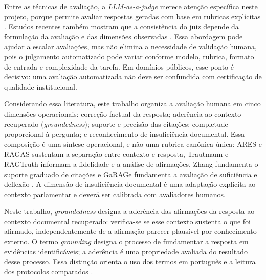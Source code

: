 Entre as técnicas de avaliação, a \textit{LLM-as-a-judge} merece atenção específica neste projeto, porque permite avaliar respostas geradas com base em rubricas explícitas \parencite{liuEtAl2023geval,liuEtAl2025judgeRag}. Estudos recentes também mostram que a consistência do juiz depende da formulação da avaliação e das dimensões observadas \parencite{liuEtAl2025judgeRag}. Essa abordagem pode ajudar a escalar avaliações, mas não elimina a necessidade de validação humana, pois o julgamento automatizado pode variar conforme modelo, rubrica, formato de entrada e complexidade da tarefa. Em domínios públicos, esse ponto é decisivo: uma avaliação automatizada não deve ser confundida com certificação de qualidade institucional.

Considerando essa literatura, este trabalho organiza a avaliação humana em cinco dimensões operacionais: correção factual da resposta; aderência ao contexto recuperado (\textit{groundedness}); suporte e precisão das citações; completude proporcional à pergunta; e reconhecimento de insuficiência documental. Essa composição é uma síntese operacional, e não uma rubrica canônica única: ARES e RAGAS sustentam a separação entre contexto e resposta, Trautmann e RAGTruth informam a fidelidade e a análise de afirmações, Zhang fundamenta o suporte graduado de citações e GaRAGe fundamenta a avaliação de suficiência e deflexão \parencite{saadFalconEtAl2024ares,esEtAl2023ragas,trautmannEtAl2024groundedness,niuEtAl2024ragtruth, zhangEtAl2024fineGrainedCitation,sorodocEtAl2025garage}. A dimensão de insuficiência documental é uma adaptação explícita ao contexto parlamentar e deverá ser calibrada com avaliadores humanos.

Neste trabalho, \textit{groundedness} designa a aderência das afirmações da resposta ao contexto documental recuperado: verifica-se se esse contexto sustenta o que foi afirmado, independentemente de a afirmação parecer plausível por conhecimento externo. O termo \textit{grounding} designa o processo de fundamentar a resposta em evidências identificáveis; a aderência é uma propriedade avaliada do resultado desse processo. Essa distinção orienta o uso dos termos em português e a leitura dos protocolos comparados \parencite{trautmannEtAl2024groundedness,niuEtAl2024ragtruth}.

